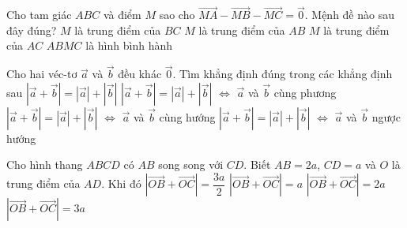 \begin{ex}%
	Cho tam giác $ABC$ và điểm $M$ sao cho $\vec{MA} - \vec{MB} - \vec{MC}  = \vec{0}$. Mệnh đề nào sau đây đúng?
	\choice
	{$M$ là trung điểm của $BC$}
	{$M$ là trung điểm của $AB$}
	{$M$ là trung điểm của $AC$}
	{\True $ABMC$ là hình bình hành}
\end{ex}

\begin{ex}%
	Cho hai véc-tơ $\vec{a}$ và $\vec{b}$ đều khác $\vec{0}$. Tìm khẳng định đúng trong các khẳng định sau
	\choice
	{$\left| \vec{a}+\vec{b} \right|= \left| \vec{a}\right|+\left| \vec{b} \right|$}
	{$\left| \vec{a}+\vec{b} \right|= \left| \vec{a}\right|+\left| \vec{b} \right|$ $ \Leftrightarrow$ $ \vec{a} $ và $\vec{b} $ cùng phương}
	{\True $\left| \vec{a}+\vec{b} \right|= \left| \vec{a}\right|+\left| \vec{b} \right|$ $ \Leftrightarrow$ $ \vec{a} $ và $\vec{b} $ cùng hướng}
	{$\left| \vec{a}+\vec{b} \right|= \left| \vec{a}\right|+\left| \vec{b} \right|$ $ \Leftrightarrow$ $ \vec{a} $ và $\vec{b} $ ngược hướng}
\end{ex}

\begin{ex}%
	Cho hình thang $ABCD$ có $AB$ song song với $CD$. Biết $AB=2a$, $CD=a$ và $O$ là trung điểm của $AD$. Khi đó
	\choice
	{$\left| \vec{OB}+\vec{OC} \right|=\dfrac{3a}{2}$}
	{$\left| \vec{OB}+\vec{OC} \right|= a$}
	{$\left| \vec{OB}+\vec{OC} \right|= 2a$}
	{\True $\left| \vec{OB}+\vec{OC} \right|= 3a$}
\end{ex}

